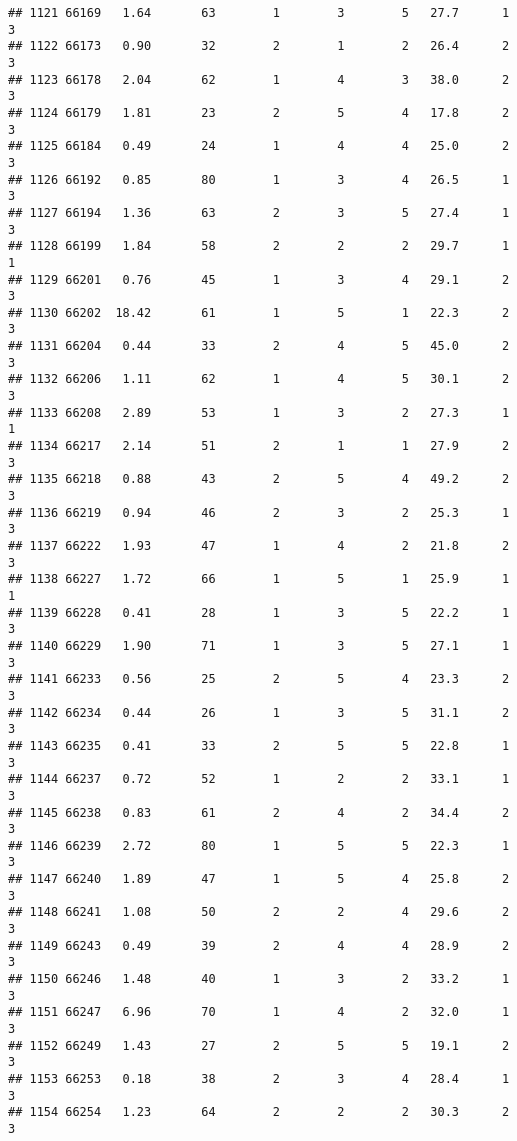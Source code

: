 \documentclass[
]{article}
\begin{document}
\begin{verbatim}
## 1121 66169   1.64       63        1        3        5   27.7      1      3
## 1122 66173   0.90       32        2        1        2   26.4      2      3
## 1123 66178   2.04       62        1        4        3   38.0      2      3
## 1124 66179   1.81       23        2        5        4   17.8      2      3
## 1125 66184   0.49       24        1        4        4   25.0      2      3
## 1126 66192   0.85       80        1        3        4   26.5      1      3
## 1127 66194   1.36       63        2        3        5   27.4      1      3
## 1128 66199   1.84       58        2        2        2   29.7      1      1
## 1129 66201   0.76       45        1        3        4   29.1      2      3
## 1130 66202  18.42       61        1        5        1   22.3      2      3
## 1131 66204   0.44       33        2        4        5   45.0      2      3
## 1132 66206   1.11       62        1        4        5   30.1      2      3
## 1133 66208   2.89       53        1        3        2   27.3      1      1
## 1134 66217   2.14       51        2        1        1   27.9      2      3
## 1135 66218   0.88       43        2        5        4   49.2      2      3
## 1136 66219   0.94       46        2        3        2   25.3      1      3
## 1137 66222   1.93       47        1        4        2   21.8      2      3
## 1138 66227   1.72       66        1        5        1   25.9      1      1
## 1139 66228   0.41       28        1        3        5   22.2      1      3
## 1140 66229   1.90       71        1        3        5   27.1      1      3
## 1141 66233   0.56       25        2        5        4   23.3      2      3
## 1142 66234   0.44       26        1        3        5   31.1      2      3
## 1143 66235   0.41       33        2        5        5   22.8      1      3
## 1144 66237   0.72       52        1        2        2   33.1      1      3
## 1145 66238   0.83       61        2        4        2   34.4      2      3
## 1146 66239   2.72       80        1        5        5   22.3      1      3
## 1147 66240   1.89       47        1        5        4   25.8      2      3
## 1148 66241   1.08       50        2        2        4   29.6      2      3
## 1149 66243   0.49       39        2        4        4   28.9      2      3
## 1150 66246   1.48       40        1        3        2   33.2      1      3
## 1151 66247   6.96       70        1        4        2   32.0      1      3
## 1152 66249   1.43       27        2        5        5   19.1      2      3
## 1153 66253   0.18       38        2        3        4   28.4      1      3
## 1154 66254   1.23       64        2        2        2   30.3      2      3

\end{verbatim}
\end{document}
